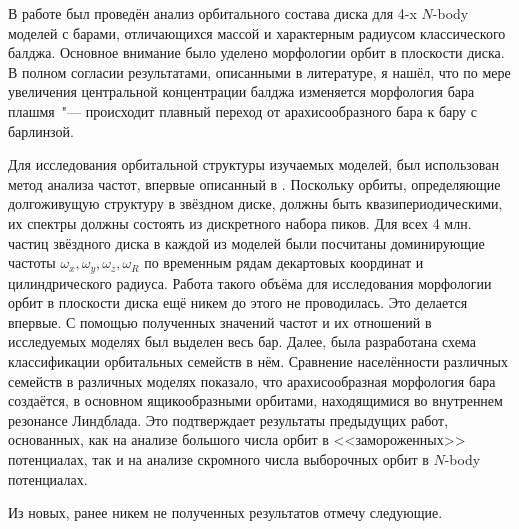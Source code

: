\documentclass{trlnotes}
\begin{document}
В работе был проведён анализ орбитального состава диска для 4-x $N$-body моделей с барами,
отличающихся массой и характерным радиусом классического балджа. Основное внимание было уделено морфологии орбит в плоскости диска. 
В полном согласии результатами, описанными в литературе, я нашёл, что по мере увеличения центральной концентрации балджа изменяется морфология бара плашмя~"--- происходит плавный переход от арахисообразного бара к 
бару с барлинзой.

Для исследования орбитальной структуры изучаемых моделей, был использован метод анализа частот, впервые описанный в \citet{binney1982}.
Поскольку орбиты, определяющие долгоживущую структуру в звёздном диске, должны быть квазипериодическими, их спектры должны состоять из
дискретного набора пиков. Для всех 4 млн. частиц звёздного диска в каждой из моделей были посчитаны доминирующие частоты
$ω_x, ω_y, ω_z, ω_R$ по временным рядам декартовых координат и цилиндрического радиуса. Работа такого объёма для исследования морфологии орбит в плоскости диска ещё никем до этого не проводилась. Это делается впервые. 
С помощью полученных значений частот и их отношений в исследуемых моделях был выделен весь бар. Далее, была разработана схема классификации орбитальных семейств в нём.
Сравнение населённости различных семейств в различных моделях показало, что арахисообразная морфология бара создаётся, в 
основном ящикообразными орбитами, находящимися во внутреннем резонансе Линдблада. Это подтверждает результаты предыдущих работ, основанных, как на анализе большого числа орбит в <<замороженных>> потенциалах, так и на анализе скромного числа выборочных орбит в $N$-body потенциалах. 

Из новых, ранее никем не полученных результатов отмечу следующие.
\end{document}
